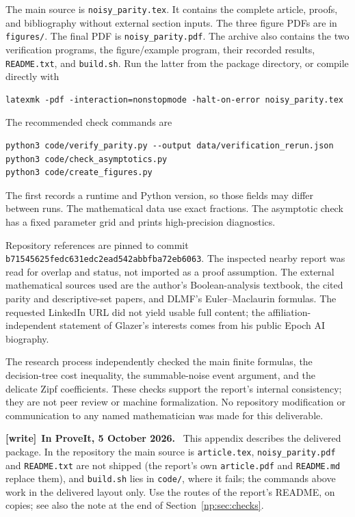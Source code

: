 \documentclass[11pt,a4paper]{article}
\theoremstyle{definition}
\theoremstyle{remark}
\newcommand{\file}[1]{\nolinkurl{#1}}
\newenvironment{writenote}[1][]{\par\smallskip\begingroup\small
 \noindent\textbf{[write]}\if\relax\detokenize{#1}\relax\else~\textbf{#1.}\fi\ }%
 {\par\endgroup\smallskip}
\begin{document}
The main source is \texttt{noisy\_parity.tex}. It contains the complete
article, proofs, and bibliography without external section inputs.
The three figure PDFs are in \texttt{figures/}. The final PDF is
\texttt{noisy\_parity.pdf}. The archive also contains the two verification
programs, the figure/example program, their recorded results,
\texttt{README.txt}, and \texttt{build.sh}.
Run the latter from the package directory, or compile directly with
\begin{verbatim}
latexmk -pdf -interaction=nonstopmode -halt-on-error noisy_parity.tex
\end{verbatim}
The recommended check commands are
\begin{verbatim}
python3 code/verify_parity.py --output data/verification_rerun.json
python3 code/check_asymptotics.py
python3 code/create_figures.py
\end{verbatim}
The first records a runtime and Python version, so those fields may differ
between runs. The mathematical data use exact fractions. The asymptotic
check has a fixed parameter grid and prints high-precision diagnostics.

Repository references are pinned to commit
\texttt{b71545625fedc631edc2ead542abbfba72eb6063}.
The inspected nearby report was read for overlap and status, not imported
as a proof assumption. The external mathematical sources used are the
author's Boolean-analysis textbook, the cited parity and descriptive-set
papers, and DLMF's Euler--Maclaurin formulas. The requested LinkedIn URL
did not yield usable full content; the affiliation-independent statement
of Glazer's interests comes from his public Epoch AI biography.

The research process independently checked the main finite formulas,
the decision-tree cost inequality, the summable-noise event argument,
and the delicate Zipf coefficients. These checks support the report's
internal consistency; they are not peer review or machine formalization.
No repository modification or communication to any named mathematician
was made for this deliverable.

\begin{writenote}[In ProveIt, 5 October 2026]
This appendix describes the delivered package. In the repository the main
source is \file{article.tex}, \file{noisy_parity.pdf} and
\file{README.txt} are not shipped (the report's own \file{article.pdf} and
\file{README.md} replace them), and \file{build.sh} lies in \file{code/},
where it fails; the commands above work in the delivered layout only. Use
the routes of the report's README, on copies; see also the note at the end
of Section~\ref{np:sec:checks}.
\end{writenote}
\end{document}

